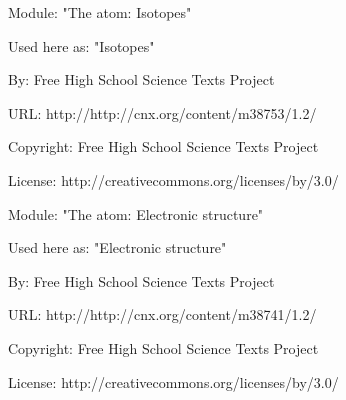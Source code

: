       \par\vspace{9pt}\noindent\begin{minipage}{\textwidth}
      Module: "The atom: Isotopes" \par\nopagebreak\noindent
      Used here as: "Isotopes" \par\nopagebreak\noindent
        By: Free High School Science Texts Project\par\nopagebreak\noindent
      URL: http://http://cnx.org/content/m38753/1.2/\par\nopagebreak\noindent
      \par\nopagebreak\noindent
      Copyright: Free High School Science Texts Project\par\nopagebreak\noindent
      License:  http://creativecommons.org/licenses/by/3.0/\par\nopagebreak\noindent
      \par\end{minipage}
      \par\vspace{9pt}\noindent\begin{minipage}{\textwidth}
      Module: "The atom: Electronic structure" \par\nopagebreak\noindent
      Used here as: "Electronic structure" \par\nopagebreak\noindent
        By: Free High School Science Texts Project\par\nopagebreak\noindent
      URL: http://http://cnx.org/content/m38741/1.2/\par\nopagebreak\noindent
      \par\nopagebreak\noindent
      Copyright: Free High School Science Texts Project\par\nopagebreak\noindent
      License:  http://creativecommons.org/licenses/by/3.0/\par\nopagebreak\noindent
      \par\end{minipage}
